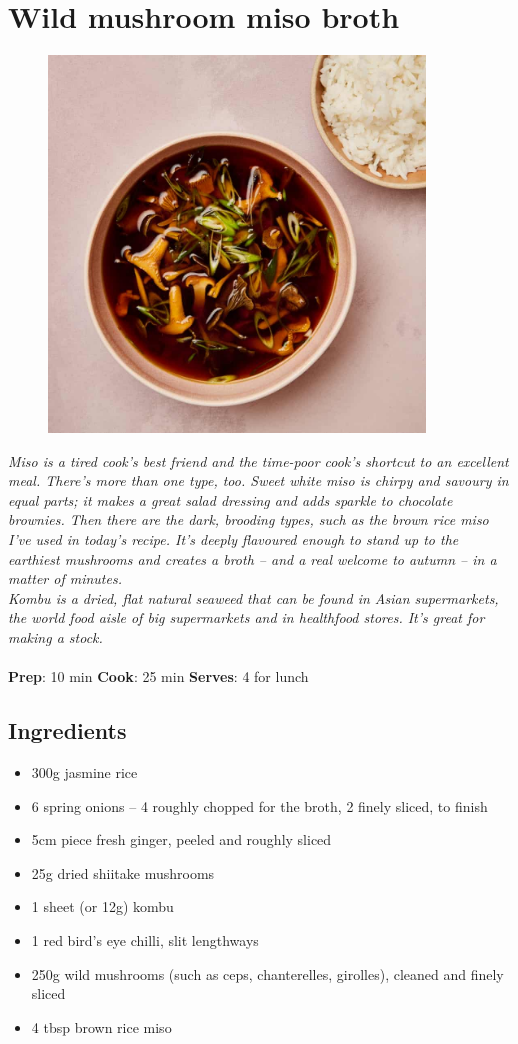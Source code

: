 \documentclass{book}
\begin{document}
\section{Wild mushroom miso broth}
\begin{figure}
\centering\includegraphics[width=10cm,height=10cm,keepaspectratio]{Recipe_Pictures/Wild_mushroom_miso_broth.png}
\end{figure}
\emph{Miso is a tired cook’s best friend and the time-poor cook’s shortcut to an excellent meal. There’s more than one type, too. Sweet white miso is chirpy and savoury in equal parts; it makes a great salad dressing and adds sparkle to chocolate brownies. Then there are the dark, brooding types, such as the brown rice miso I’ve used in today’s recipe. It’s deeply flavoured enough to stand up to the earthiest mushrooms and creates a broth – and a real welcome to autumn – in a matter of minutes.\\ 
Kombu is a dried, flat natural seaweed that can be found in Asian supermarkets, the world food aisle of big supermarkets and in healthfood stores. It’s great for making a stock.}\\\\ 
\textbf{Prep}: 10 min
\textbf{Cook}: 25 min
\textbf{Serves}: 4 for lunch
\subsection*{Ingredients}
\begin{itemize}
\item 300g jasmine rice
\item 6 spring onions – 4 roughly chopped for the broth, 2 finely sliced, to finish
\item 5cm piece fresh ginger, peeled and roughly sliced
\item 25g dried shiitake mushrooms
\item 1 sheet (or 12g) kombu
\item 1 red bird’s eye chilli, slit lengthways
\item 250g wild mushrooms (such as ceps, chanterelles, girolles), cleaned and finely sliced
\item 4 tbsp brown rice miso
\end{itemize}
\end{document}
